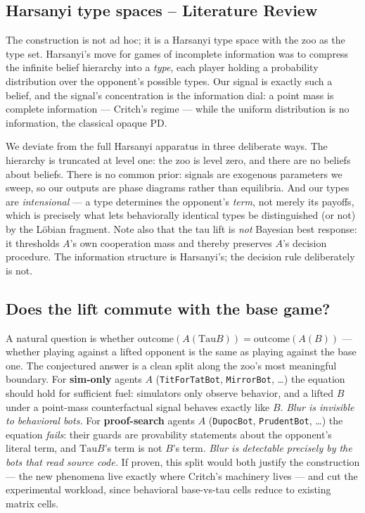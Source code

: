 \documentclass[11pt]{article}
\newcommand{\zoobot}[1]{\texttt{#1}}
\newcommand{\dupoc}{\zoobot{DupocBot}}
\newcommand{\Tau}{\mathrm{Tau}}
\begin{document}
\subsection{Harsanyi type spaces -- Literature Review}

The construction is not ad hoc; it is a Harsanyi type space with the zoo as
the type set. Harsanyi's move for games of incomplete information was to
compress the infinite belief hierarchy into a \emph{type}, each player
holding a probability distribution over the opponent's possible types. Our
signal is exactly such a belief, and the signal's concentration is the
information dial: a point mass is complete information --- Critch's regime
--- while the uniform distribution is no information, the classical opaque
PD.

We deviate from the full Harsanyi apparatus in three deliberate ways. The
hierarchy is truncated at level one: the zoo is level zero, and there are no
beliefs about beliefs. There is no common prior: signals are exogenous
parameters we sweep, so our outputs are phase diagrams rather than
equilibria. And our types are \emph{intensional} --- a type determines the
opponent's \emph{term}, not merely its payoffs, which is precisely what lets
behaviorally identical types be distinguished (or not) by the L\"obian
fragment. Note also that the tau lift is \emph{not} Bayesian best response:
it thresholds $A$'s own cooperation mass and thereby preserves $A$'s
decision procedure. The information structure is Harsanyi's; the decision
rule deliberately is not.

\subsection{Does the lift commute with the base game?}

A natural question is whether
$\mathrm{outcome}(A(\Tau B)) = \mathrm{outcome}(A(B))$ --- whether playing
against a lifted opponent is the same as playing against the base one. The
conjectured answer is a clean split along the zoo's most meaningful
boundary. For \textbf{sim-only} agents $A$ (\zoobot{TitForTatBot},
\zoobot{MirrorBot}, \dots) the equation should hold for sufficient fuel:
simulators only observe behavior, and a lifted $B$ under a point-mass
counterfactual signal behaves exactly like $B$. \emph{Blur is invisible to
behavioral bots.} For \textbf{proof-search} agents $A$ (\dupoc,
\zoobot{PrudentBot}, \dots) the equation \emph{fails}: their guards are
provability statements about the opponent's literal term, and
$\Tau B$'s term is not $B$'s term. \emph{Blur is detectable precisely by
the bots that read source code.} If proven, this split would both justify
the construction --- the new phenomena live exactly where Critch's
machinery lives --- and cut the experimental workload, since behavioral
base-vs-tau cells reduce to existing matrix cells.
\end{document}
